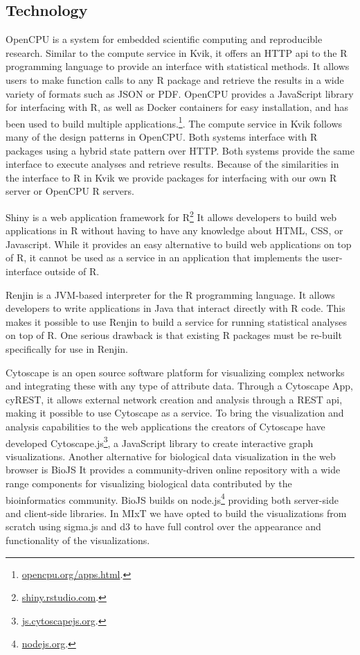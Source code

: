 \subsection{Technology} 
OpenCPU is a system for embedded scientific computing and reproducible
research.\cite{opencpu} Similar to the compute service in Kvik, it offers an
HTTP \gls{api} to the R programming language to provide an interface with
statistical methods. It allows users to make function calls to any R package and
retrieve the results in a wide variety of formats such as JSON or PDF. OpenCPU
provides a JavaScript library for interfacing with R, as well as Docker
containers for easy installation, and has been used to build multiple
applications.\footnote{\url{opencpu.org/apps.html}.}. The compute service in
Kvik follows many of the design patterns in OpenCPU. Both systems interface with
R packages using a hybrid state pattern over HTTP. Both systems provide the same
interface to execute analyses and retrieve results.  Because of the similarities
in the interface to R in Kvik we provide packages for interfacing with our own R
server or OpenCPU R servers.

Shiny is a web application framework for R\footnote{\url{shiny.rstudio.com}.}
It allows developers to build web applications in R without having to have any
knowledge about HTML, CSS, or Javascript. While it provides an easy alternative
to build web applications on top of R, it cannot be used as a service in an
application that implements the user-interface outside of R.  

Renjin is a JVM-based interpreter for the R programming language.\cite{renjin}
It allows developers to write applications in Java that interact directly with R
code. This makes it possible to use Renjin to build a service for running
statistical analyses on top of R. One serious drawback is that existing R
packages must be re-built specifically for use in Renjin. 

Cytoscape is an open source software platform for visualizing complex networks
and integrating these with any type of attribute
data.\cite{shannon2003cytoscape} Through a Cytoscape App, cyREST, it allows
external network creation and analysis through a REST \gls{api}\cite{ono2015cyrest},
making it possible to use Cytoscape as a service.  To bring the visualization
and analysis capabilities to the web applications the creators of Cytoscape have
developed Cytoscape.js\footnote{\url{js.cytoscapejs.org}.}, a JavaScript library
to create interactive graph visualizations.  Another alternative for biological
data visualization in the web browser is BioJS It provides a community-driven
online repository with a wide range components for visualizing biological data
contributed by the bioinformatics community.\cite{gomez2013biojs} BioJS builds
on node.js\footnote{\url{nodejs.org}.} providing both server-side and
client-side libraries. In MIxT we have opted to build the visualizations from
scratch using sigma.js and d3 to have full control over the appearance and
functionality of the visualizations. 

